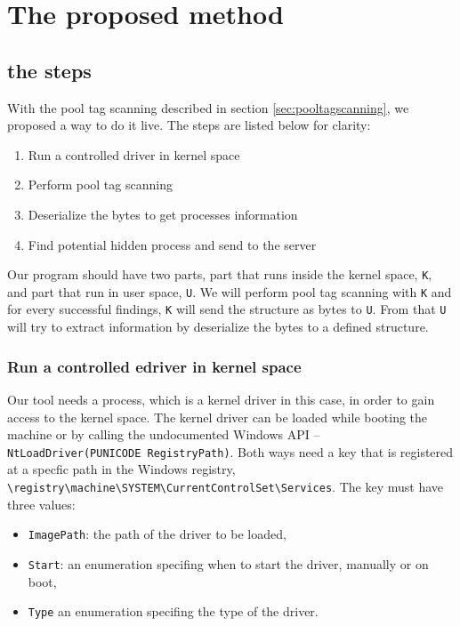 \chapter[The proposed method]{The proposed method}

\section[The steps]{the steps}

With the pool tag scanning described in section \ref{sec:pooltagscanning}, we proposed a way to do it live. The steps are listed below for clarity:

\begin{enumerate} %
  \item Run a controlled driver in kernel space
  \item Perform pool tag scanning
  \item Deserialize the bytes to get processes information
  \item Find potential hidden process and send to the server
\end{enumerate}

Our program should have two parts, part that runs inside the kernel space, \texttt{K}, and part that run in user space, \texttt{U}. We will perform pool tag scanning with \texttt{K} and for every successful findings, \texttt{K} will send the structure as bytes to \texttt{U}. From that \texttt{U} will try to extract information by deserialize the bytes to a defined structure.

\subsection[Run a controlled driver in kernel space]{Run a controlled edriver in kernel space}

Our tool needs a process, which is a kernel driver in this case, in order to gain access to the kernel space. The kernel driver can be loaded while booting the machine or by calling the undocumented Windows API -- \texttt{NtLoadDriver(PUNICODE RegistryPath)}. Both ways need a key that is registered at a specfic path in the Windows registry, \texttt{\textbackslash registry\textbackslash machine\textbackslash SYSTEM\textbackslash CurrentControlSet\textbackslash Services}. The key must have three values:

\begin{itemize}
  \item \texttt{ImagePath}: the path of the driver to be loaded,
  \item \texttt{Start}: an enumeration specifing when to start the driver, manually or on boot,
  \item \texttt{Type} an enumeration specifing the type of the driver.
\end{itemize}

